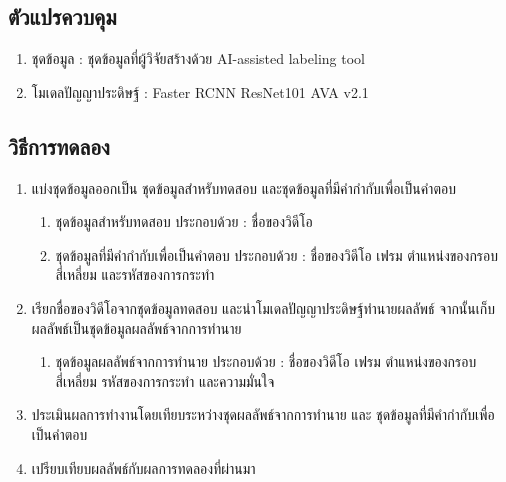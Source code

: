 \subsection*{ตัวแปรควบคุม}
	\begin{enumerate}
		\item ชุดข้อมูล : ชุดข้อมูลที่ผู้วิจัยสร้างด้วย AI-assisted labeling tool
		\item โมเดลปัญญาประดิษฐ์ : Faster RCNN ResNet101 AVA v2.1
	\end{enumerate}
\subsection*{วิธีการทดลอง}
	\begin{enumerate}
		\item แบ่งชุดข้อมูลออกเป็น ชุดข้อมูลสำหรับทดสอบ และชุดข้อมูลที่มีคำกำกับเพื่อเป็นคำตอบ
			\begin{enumerate}
				\item ชุดข้อมูลสำหรับทดสอบ ประกอบด้วย : ชื่อของวิดีโอ
				\item ชุดข้อมูลที่มีคำกำกับเพื่อเป็นคำตอบ ประกอบด้วย : ชื่อของวิดีโอ เฟรม ตำแหน่งของกรอบสี่เหลี่ยม และรหัสของการกระทำ
			\end{enumerate}
		\item เรียกชื่อของวิดีโอจากชุดข้อมูลทดสอบ และนำโมเดลปัญญาประดิษฐ์ทำนายผลลัพธ์ จากนั้นเก็บผลลัพธ์เป็นชุดข้อมูลผลลัพธ์จากการทำนาย
			\begin{enumerate}
				\item ชุดข้อมูลผลลัพธ์จากการทำนาย ประกอบด้วย : ชื่อของวิดีโอ เฟรม ตำแหน่งของกรอบสี่เหลี่ยม รหัสของการกระทำ และความมั่นใจ
			\end{enumerate}
		\item ประเมินผลการทำงานโดยเทียบระหว่างชุดผลลัพธ์จากการทำนาย และ ชุดข้อมูลที่มีคำกำกับเพื่อเป็นคำตอบ	
		\item เปรียบเทียบผลลัพธ์กับผลการทดลองที่ผ่านมา
\end{enumerate}





